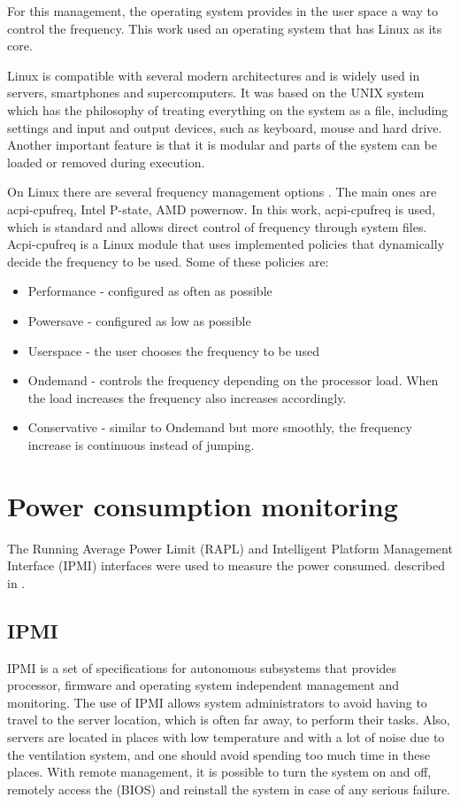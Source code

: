 For this management, the operating system provides in the user space a way to control the frequency. This work used an operating system that has Linux as its core.

Linux is compatible with several modern architectures and is widely used in servers, smartphones and supercomputers. It was based on the UNIX system which has the philosophy of treating everything on the system as a file, including settings and input and output devices, such as keyboard, mouse and hard drive. Another important feature is that it is modular and parts of the system can be loaded or removed during execution.

On Linux there are several frequency management options \cite {Brown2005ACPILinux}. The main ones are acpi-cpufreq, Intel P-state, AMD powernow. In this work, acpi-cpufreq is used, which is standard and allows direct control of frequency through system files. Acpi-cpufreq is a Linux module that uses implemented policies that dynamically decide the frequency to be used. Some of these policies are:

\begin{itemize}
\item Performance - configured as often as possible
\item Powersave - configured as low as possible
\item Userspace - the user chooses the frequency to be used
\item Ondemand - controls the frequency depending on the processor load. When the load increases the frequency also increases accordingly.
\item Conservative - similar to Ondemand but more smoothly, the frequency increase is continuous instead of jumping.
\end{itemize}

\section{Power consumption monitoring} \label{sec:power_consumption_monitoring}
The Running Average Power Limit (RAPL) and Intelligent Platform Management Interface (IPMI) interfaces were used to measure the power consumed. described in \cite{IPMI2013ConfigurationGuide}.

\subsection{IPMI}
IPMI \cite{IPMI2013ConfigurationGuide} is a set of specifications for autonomous subsystems that provides processor, firmware and operating system independent management and monitoring. The use of IPMI allows system administrators to avoid having to travel to the server location, which is often far away, to perform their tasks. Also, servers are located in places with low temperature and with a lot of noise due to the ventilation system, and one should avoid spending too much time in these places. With remote management, it is possible to turn the system on and off, remotely access the (BIOS) and reinstall the system in case of any serious failure.

